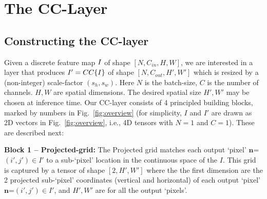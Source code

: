 \section{The CC-Layer}
\label{sec:implement}
\subsection{Constructing the CC-layer}
\label{sec:implement_construct}
Given a discrete feature map $\textcolor{black}{I}$ of shape $[N,C_{in},H,W]$, we are interested in a layer that produces $\textcolor{black}{I'}=CC\{\textcolor{black}{I}\}$ of shape $[N,C_{out},H',W']$ which is resized by a (non-integer) scale-factor $(s_h, s_w)$. Here $N$ is the batch-size, $C$ is the number of channels. $H,W$ are spatial dimensions. The desired spatial size $H',W'$ may be chosen at inference time.
Our CC-layer consists of 4 principled building blocks, marked by numbers in Fig.~\ref{fig:overview} (for simplicity, $I$ and $I'$ are drawn as 2D vectors in Fig.~\ref{fig:overview}, i.e.,  4D tensors with $N=1$ and $C=1$). These are described next:

\textbf{Block 1 -- Projected-grid:} 
The Projected grid  matches each output `pixel' $\textbf{n}$=$(i', j')$$\in$$I'$ to a sub-`pixel' location  in the continuous space of the  $I$. This grid is captured by a tensor of shape $[2,H',W']$ where the the first dimension are the 2 projected sub-`pixel' coordinates (vertical and horizontal) of each output `pixel' $\textbf{n}$=$(i', j')$$\in$$I'$, and $H', W'$ are for all the output `pixels'.


